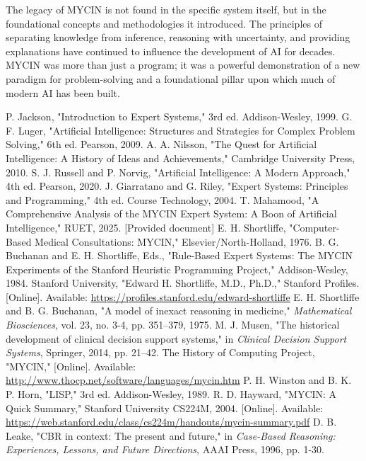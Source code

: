\documentclass[conference]{IEEEtran}
\begin{document}
The legacy of MYCIN is not found in the specific system itself, but in the foundational concepts and methodologies it introduced. The principles of separating knowledge from inference, reasoning with uncertainty, and providing explanations have continued to influence the development of AI for decades. MYCIN was more than just a program; it was a powerful demonstration of a new paradigm for problem-solving and a foundational pillar upon which much of modern AI has been built.




\begin{thebibliography}{00}
 P. Jackson, "Introduction to Expert Systems," 3rd ed. Addison-Wesley, 1999.
 G. F. Luger, "Artificial Intelligence: Structures and Strategies for Complex Problem Solving," 6th ed. Pearson, 2009.
 A. A. Nilsson, "The Quest for Artificial Intelligence: A History of Ideas and Achievements," Cambridge University Press, 2010.
 S. J. Russell and P. Norvig, "Artificial Intelligence: A Modern Approach," 4th ed. Pearson, 2020.
 J. Giarratano and G. Riley, "Expert Systems: Principles and Programming," 4th ed. Course Technology, 2004.
 T. Mahamood, "A Comprehensive Analysis of the MYCIN Expert System: A Boon of Artificial Intelligence," RUET, 2025. [Provided document]
 E. H. Shortliffe, "Computer-Based Medical Consultations: MYCIN," Elsevier/North-Holland, 1976.
 B. G. Buchanan and E. H. Shortliffe, Eds., "Rule-Based Expert Systems: The MYCIN Experiments of the Stanford Heuristic Programming Project," Addison-Wesley, 1984.
 Stanford University, "Edward H. Shortliffe, M.D., Ph.D.," Stanford Profiles. [Online]. Available: \url{https://profiles.stanford.edu/edward-shortliffe}
 E. H. Shortliffe and B. G. Buchanan, "A model of inexact reasoning in medicine," \textit{Mathematical Biosciences}, vol. 23, no. 3-4, pp. 351–379, 1975.
 M. J. Musen, "The historical development of clinical decision support systems," in \textit{Clinical Decision Support Systems}, Springer, 2014, pp. 21–42.
 The History of Computing Project, "MYCIN," [Online]. Available: \url{http://www.thocp.net/software/languages/mycin.htm}
 P. H. Winston and B. K. P. Horn, "LISP," 3rd ed. Addison-Wesley, 1989.
 R. D. Hayward, "MYCIN: A Quick Summary," Stanford University CS224M, 2004. [Online]. Available: \url{https://web.stanford.edu/class/cs224m/handouts/mycin-summary.pdf}
 D. B. Leake, "CBR in context: The present and future," in \textit{Case-Based Reasoning: Experiences, Lessons, and Future Directions}, AAAI Press, 1996, pp. 1-30.

\end{thebibliography}
\end{document}
